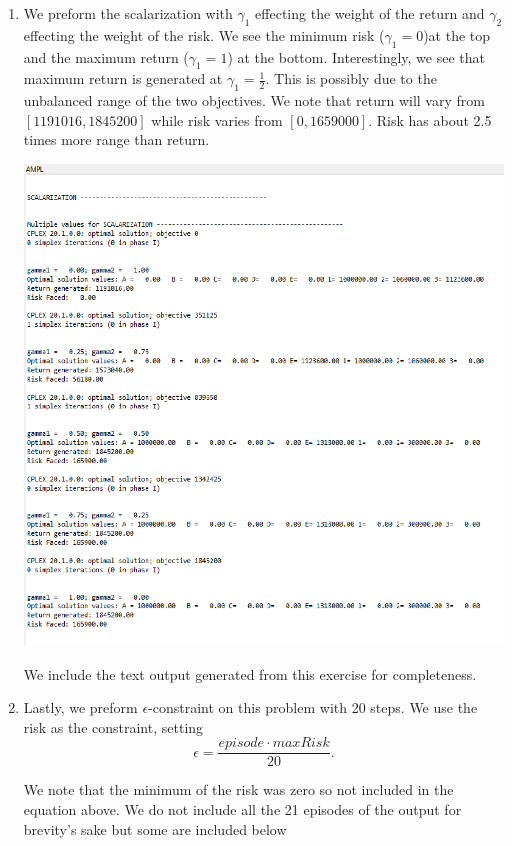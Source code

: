 \documentclass[11pt]{article}
\begin{document}
\begin{enumerate}
\begin{enumerate}
\begin{enumerate}
\item We preform the scalarization with $\gamma_1$ effecting the weight of the return and $\gamma_2$ effecting the weight of the risk.  We see the minimum risk ($\gamma_1 = 0$)at the top and the maximum return ($\gamma_1 = 1$) at the bottom.  Interestingly, we see that maximum return is generated at $\gamma_1 = \frac12$.  This is possibly due to the unbalanced range of the two objectives.  We note that return will vary from $[1191016,1845200]$ while risk varies from $[0,1659000]$.  Risk has about 2.5 times more range than return.

 \includegraphics[width = .9\textwidth]{output1aiii.png}

We include the text output generated from this exercise for completeness.

{\tiny {}}

\item Lastly, we preform $\epsilon$-constraint on this problem with 20 steps.  We use the risk as the constraint, setting
\[
\epsilon =\frac{episode\cdot maxRisk}{20}.
\]

We note that the minimum of the risk was zero so not included in the equation above.  We do not include all the 21 episodes of the output for brevity's sake but some are included below



\end{enumerate}
\end{enumerate}
\end{enumerate}
\end{document}

